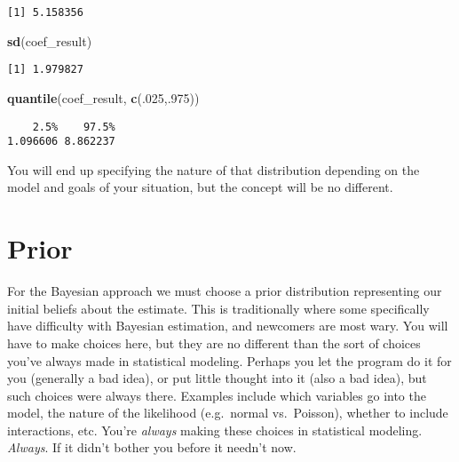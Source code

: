\documentclass[]{book}
\newenvironment{Shaded}{\begin{snugshade}}{\end{snugshade}}
\newcommand{\KeywordTok}[1]{\textcolor[rgb]{0.13,0.29,0.53}{\textbf{{#1}}}}
\newcommand{\DecValTok}[1]{\textcolor[rgb]{0.00,0.00,0.81}{{#1}}}
\newcommand{\NormalTok}[1]{{#1}}
\begin{document}
\begin{verbatim}
[1] 5.158356
\end{verbatim}

\begin{Shaded}
\begin{Highlighting}[]
\KeywordTok{sd}\NormalTok{(coef_result)}
\end{Highlighting}
\end{Shaded}

\begin{verbatim}
[1] 1.979827
\end{verbatim}

\begin{Shaded}
\begin{Highlighting}[]
\KeywordTok{quantile}\NormalTok{(coef_result, }\KeywordTok{c}\NormalTok{(.}\DecValTok{025}\NormalTok{,.}\DecValTok{975}\NormalTok{))}
\end{Highlighting}
\end{Shaded}

\begin{verbatim}
    2.5%    97.5% 
1.096606 8.862237 
\end{verbatim}

You will end up specifying the nature of that distribution depending on
the model and goals of your situation, but the concept will be no
different.

\section{Prior}\label{prior}

For the Bayesian approach we must choose a {prior distribution}
representing our initial beliefs about the estimate. This is
traditionally where some specifically have difficulty with Bayesian
estimation, and newcomers are most wary. You will have to make choices
here, but they are no different than the sort of choices you've always
made in statistical modeling. Perhaps you let the program do it for you
(generally a bad idea), or put little thought into it (also a bad idea),
but such choices were always there. Examples include which variables go
into the model, the nature of the likelihood (e.g.~normal vs.~Poisson),
whether to include interactions, etc. You're \emph{always} making these
choices in statistical modeling. \emph{Always}. If it didn't bother you
before it needn't now.
\end{document}
